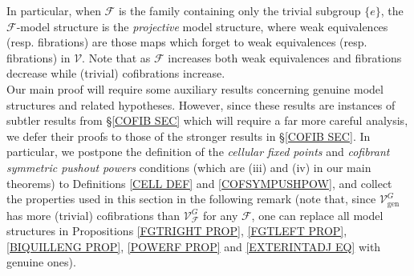 \documentclass[a4paper,10pt
,draft
]{article}%
\numberwithin{equation}{section}
\numberwithin{figure}{section}
\theoremstyle{definition} %
\newtheorem{remark}[equation]{Remark}%
\newcommand{\F}{\ensuremath{\mathcal F}}
\newcommand{\V}{\ensuremath{\mathcal V}}
\newcommand{\1}{\ensuremath{\mathbbm 1}}%
\begin{document}
In particular, when $\F$ 
is the family containing only the trivial subgroup $\{e\}$,
the $\F$-model structure is the \textit{projective} model structure, where weak equivalences (resp. fibrations) are those maps which forget to weak equivalences (resp. fibrations) in $\V$.
Note that as $\F$ increases 
both weak equivalences and fibrations decrease while
(trivial) cofibrations increase.\\

Our main proof will require some auxiliary results concerning genuine model structures and related hypotheses.
However, since these results are 
instances of subtler results from \S \ref{COFIB SEC}
which will require a far more careful analysis,
we defer their %
proofs to those
of the stronger results in \S \ref{COFIB SEC}.
%
In particular, 
we postpone the definition of the
\emph{cellular fixed points}
and
\emph{cofibrant symmetric pushout powers}
conditions
(which are (iii) and (iv) in our main theorems)
to Definitions \ref{CELL DEF} and \ref{COFSYMPUSHPOW},
and collect the properties used in this section
in the following remark
%
(note that, since $\V^G_{\text{gen}}$
has more (trivial) cofibrations than 
$\V^G_{\mathcal{F}}$ for any $\F$,
one can replace all model structures in
Propositions \ref{FGTRIGHT PROP},
\ref{FGTLEFT PROP}, 
\ref{BIQUILLENG PROP}, 
\ref{POWERF PROP}
and \eqref{EXTERINTADJ EQ} with genuine ones).



\end{document}
